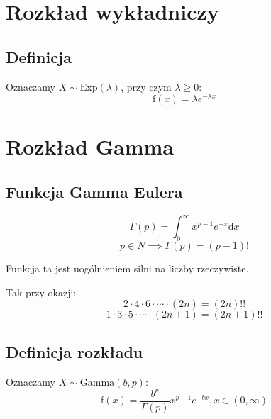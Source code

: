 \documentclass[a4paper,12pt]{article}
\begin{document}
\section{Rozkład wykładniczy}

\subsection{Definicja}
Oznaczamy $X \sim \textrm{Exp}\left(\lambda\right)$, przy czym $\lambda \geq 0$:
\begin{equation}
\textrm{f}\left(x\right) = \lambda e^{-\lambda x}
\end{equation}

\section{Rozkład Gamma}

\subsection{Funkcja Gamma Eulera}
\begin{equation}
\Gamma\left(p\right) = \int_{0}^{\infty}x^{p-1}e^{-x}\textrm{d}x
\end{equation}
\begin{equation}
p \in {N} \implies \Gamma\left(p\right) = \left(p-1\right)!
\end{equation}

Funkcja ta jest uogólnieniem silni na liczby rzeczywiste.

Tak przy okazji:
\begin{equation}
2 \cdot 4 \cdot 6 \cdot \cdots \cdot \left(2n\right) = \left(2n\right)!!
\end{equation}
\begin{equation}
1 \cdot 3 \cdot 5 \cdot \cdots \cdot \left(2n+1\right) = \left(2n+1\right)!!
\end{equation}

\subsection{Definicja rozkładu}

Oznaczamy $X \sim \textrm{Gamma}\left(b, p\right)$:
\begin{equation}
\textrm{f}\left(x\right) = \frac{b^p}{\Gamma\left(p\right)}x^{p-1}e^{-bx}, x \in \left(0, \infty\right)
\end{equation}
\end{document}

